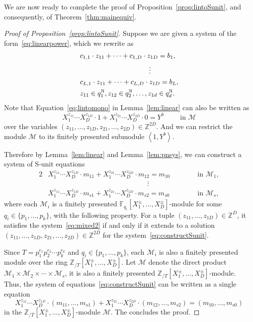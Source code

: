 \documentclass[letterpaper, 11pt, thm-restate]{article}
\numberwithin{equation}{section}
\newcommand{\Z}{\mathbb{Z}}
\newcommand{\N}{\mathbb{N}}
\newcommand{\F}{\mathbb{F}}
\newcommand{\ZT}{\mathbb{Z}_{/T}}
\newcommand{\mM}{\mathcal{M}}
\newcommand{\gen}[1]{\left\langle {#1} \right\rangle}
\theoremstyle{definition}
\theoremstyle{definition}
\theoremstyle{definition}
\begin{document}
We are now ready to complete the proof of Proposition~\ref{prop:lintoSunit}, and consequently, of Theorem~\ref{thm:mainequiv}.
\begin{proof}[Proof of Proposition~\ref{prop:lintoSunit}]
    Suppose we are given a system of the form~\eqref{eq:linearpower}, which we rewrite as
    \begin{align}\label{eq:mixed2}
        & c_{1,1} \cdot z_{11} + \cdots  + c_{1, D} \cdot z_{1D} = b_1, \nonumber\\
        & \hspace{3.5cm} \vdots \\
        & c_{L,1} \cdot z_{11} + \cdots + c_{L, D} \cdot z_{1D} = b_L, \nonumber\\
        & z_{11} \in q_1^{\N}, z_{12} \in q_2^{\N}, \ldots, z_{1d} \in q_d^{\N}. \nonumber
    \end{align}
    Note that Equation~\eqref{eq:lintomono} in Lemma~\ref{lem:linear} can also be written as
    \[
    X_1^{z_{11}} \cdots X_D^{z_{1D}} \cdot 1 + X_1^{z_{21}} \cdots X_D^{z_{2D}} \cdot 0 = Y^b \qquad \text{ in } \mM
    \]
    over the variables $(z_{11}, \ldots, z_{1D}, z_{21}, \ldots, z_{2D}) \in \Z^{2D}$. And we can restrict the module $\mM$ to its finitely presented submodule $\gen{1, Y^b}$.
    
    Therefore by Lemma~\ref{lem:linear} and Lemma~\ref{lem:pnsys}, we can construct a system of S-unit equations
    \begin{alignat}{2}\label{eq:constructSunit}
        & X_1^{z_{11}} \cdots X_D^{z_{1D}} \cdot m_{11} + X_1^{z_{21}} \cdots X_D^{z_{2D}} \cdot m_{12} = m_{10} && \qquad \text{ in } \mM_1, \nonumber\\
        & \hspace{6cm} \vdots && \\
         & X_1^{z_{11}} \cdots X_D^{z_{1D}} \cdot m_{s 1} + X_1^{z_{21}} \cdots X_D^{z_{2D}} \cdot m_{s2} = m_{s0} && \qquad \text{ in } \mM_s, \nonumber
    \end{alignat}
     where each $\mM_i$ is a finitely presented $\F_{q_i}[X_1^{\pm}, \ldots, X_D^{\pm}]$-module for some $q_i \in \{p_1, \ldots, p_k\}$, with the following property.
    For a tuple $(z_{11}, \ldots, z_{1D}) \in \Z^D$, it satisfies the system~\eqref{eq:mixed2} if and only if it extends to a solution $(z_{11}, \ldots, z_{1D}, z_{21}, \ldots, z_{2D}) \in \Z^{2D}$ for the system~\eqref{eq:constructSunit}.

    Since $T = p_1^{e_1} p_2^{e_2} \cdots p_k^{e_k}$ and $q_i \in \{p_1, \ldots, p_k\}$, each $\mM_i$ is also a finitely presented module over the ring $\ZT[X_1^{\pm}, \ldots, X_D^{\pm}]$.
    Let $\mM$ denote the direct product $\mM_1 \times \mM_2 \times \cdots \times \mM_s$, it is also a finitely presented $\ZT[X_1^{\pm}, \ldots, X_D^{\pm}]$-module.
    Thus, the system of equations~\eqref{eq:constructSunit} can be written as a single equation
    \[
    X_1^{z_{11}} \cdots X_D^{z_{1D}} \cdot (m_{11}, \ldots, m_{s1}) + X_1^{z_{21}} \cdots X_D^{z_{2D}} \cdot (m_{12}, \ldots, m_{s2}) = (m_{10}, \ldots, m_{s0})
    \]
    in the $\ZT[X_1^{\pm}, \ldots, X_D^{\pm}]$-module $\mM$.
    The concludes the proof.
\end{proof}
\end{document}
